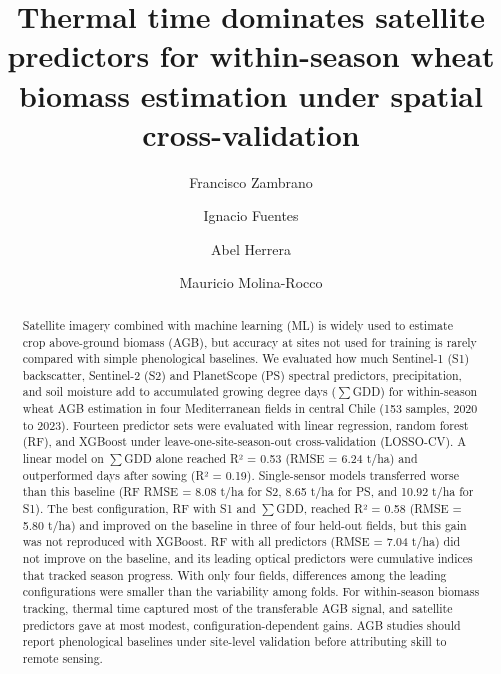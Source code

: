 \documentclass[
  english,
  review,
  number,
  sort,compress,
  authoryear,
  3p]{elsarticle}
\begin{document}
\begin{frontmatter}
\title{Thermal time dominates satellite predictors for within-season
wheat biomass estimation under spatial cross-validation}
\author[1]{Francisco Zambrano%
%
}
\author[1]{Ignacio Fuentes%
%
}

\author[2]{Abel Herrera%
%
}

\author[3]{Mauricio Molina-Rocco%
%
}







        
\begin{abstract}
Satellite imagery combined with machine learning (ML) is widely used to
estimate crop above-ground biomass (AGB), but accuracy at sites not used
for training is rarely compared with simple phenological baselines. We
evaluated how much Sentinel-1 (S1) backscatter, Sentinel-2 (S2) and
PlanetScope (PS) spectral predictors, precipitation, and soil moisture
add to accumulated growing degree days (\(\sum\)GDD) for within-season
wheat AGB estimation in four Mediterranean fields in central Chile (153
samples, 2020 to 2023). Fourteen predictor sets were evaluated with
linear regression, random forest (RF), and XGBoost under
leave-one-site-season-out cross-validation (LOSSO-CV). A linear model on
\(\sum\)GDD alone reached R² = 0.53 (RMSE = 6.24 t/ha) and outperformed
days after sowing (R² = 0.19). Single-sensor models transferred worse
than this baseline (RF RMSE = 8.08 t/ha for S2, 8.65 t/ha for PS, and
10.92 t/ha for S1). The best configuration, RF with S1 and \(\sum\)GDD,
reached R² = 0.58 (RMSE = 5.80 t/ha) and improved on the baseline in
three of four held-out fields, but this gain was not reproduced with
XGBoost. RF with all predictors (RMSE = 7.04 t/ha) did not improve on
the baseline, and its leading optical predictors were cumulative indices
that tracked season progress. With only four fields, differences among
the leading configurations were smaller than the variability among
folds. For within-season biomass tracking, thermal time captured most of
the transferable AGB signal, and satellite predictors gave at most
modest, configuration-dependent gains. AGB studies should report
phenological baselines under site-level validation before attributing
skill to remote sensing.
\end{abstract}




\end{frontmatter}
\end{document}
